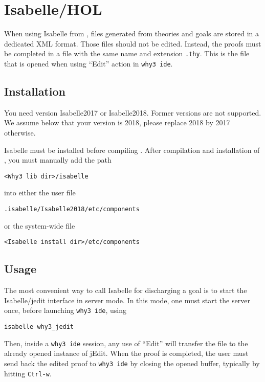 \section{Isabelle/HOL}
\label{sec:isabelle}


When using Isabelle from \why, files generated from \why theories and
goals are stored in a dedicated XML format. Those files should not be
edited. Instead, the proofs must be completed in a file with the same
name and extension \texttt{.thy}. This is the file that is opened when
using ``Edit'' action in \texttt{why3 ide}.

\subsection{Installation}

You need version Isabelle2017 or Isabelle2018. Former versions are not
supported. We assume below that your version is 2018, please replace
2018 by 2017 otherwise.

Isabelle must be installed before compiling \why. After compilation
and installation of \why, you must manually add the path
\begin{verbatim}
<Why3 lib dir>/isabelle
\end{verbatim}
into either the user file
\begin{verbatim}
.isabelle/Isabelle2018/etc/components
\end{verbatim}
or the system-wide file
\begin{verbatim}
<Isabelle install dir>/etc/components
\end{verbatim}

\subsection{Usage}

The most convenient way to call Isabelle for discharging a \why goal
is to start the Isabelle/jedit interface in server mode. In this mode,
one must start the server once, before launching \texttt{why3 ide},
using
\begin{verbatim}
isabelle why3_jedit
\end{verbatim}
Then, inside a \texttt{why3 ide} session, any use of ``Edit'' will
transfer the file to the already opened instance of jEdit. When the
proof is completed, the user must send back the edited proof to
\texttt{why3 ide} by closing the opened buffer, typically by hitting
\texttt{Ctrl-w}.


